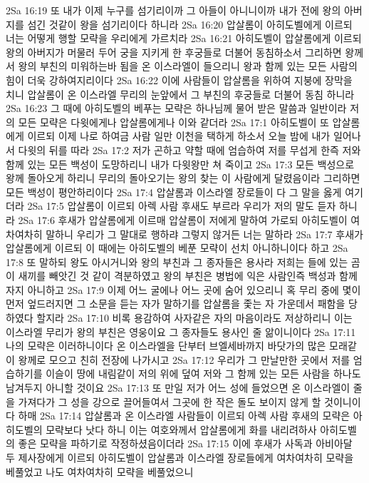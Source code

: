 2Sa 16:19  또 내가 이제 누구를 섬기리이까 그 아들이 아니니이까 내가 전에 왕의 아버지를 섬긴 것같이 왕을 섬기리이다 하니라
2Sa 16:20  압살롬이 아히도벨에게 이르되 너는 어떻게 행할 모략을 우리에게 가르치라
2Sa 16:21  아히도벨이 압살롬에게 이르되 왕의 아버지가 머물러 두어 궁을 지키게 한 후궁들로 더불어 동침하소서 그리하면 왕께서 왕의 부친의 미워하는바 됨을 온 이스라엘이 들으리니 왕과 함께 있는 모든 사람의 힘이 더욱 강하여지리이다
2Sa 16:22  이에 사람들이 압살롬을 위하여 지붕에 장막을 치니 압살롬이 온 이스라엘 무리의 눈앞에서 그 부친의 후궁들로 더불어 동침 하니라
2Sa 16:23  그 때에 아히도벨의 베푸는 모략은 하나님께 물어 받은 말씀과 일반이라 저의 모든 모략은 다윗에게나 압살롬에게나 이와 같더라
2Sa 17:1  아히도벨이 또 압살롬에게 이르되 이제 나로 하여금 사람 일만 이천을 택하게 하소서 오늘 밤에 내가 일어나서 다윗의 뒤를 따라
2Sa 17:2  저가 곤하고 약할 때에 엄습하여 저를 무섭게 한즉 저와 함께 있는 모든 백성이 도망하리니 내가 다윗왕만 쳐 죽이고
2Sa 17:3  모든 백성으로 왕께 돌아오게 하리니 무리의 돌아오기는 왕의 찾는 이 사람에게 달렸음이라 그리하면 모든 백성이 평안하리이다
2Sa 17:4  압살롬과 이스라엘 장로들이 다 그 말을 옳게 여기더라
2Sa 17:5  압살롬이 이르되 아렉 사람 후새도 부르라 우리가 저의 말도 듣자 하니라
2Sa 17:6  후새가 압살롬에게 이르매 압살롬이 저에게 말하여 가로되 아히도벨이 여차여차히 말하니 우리가 그 말대로 행하랴 그렇지 않거든 너는 말하라
2Sa 17:7  후새가 압살롬에게 이르되 이 때에는 아히도벨의 베푼 모략이 선치 아니하니이다 하고
2Sa 17:8  또 말하되 왕도 아시거니와 왕의 부친과 그 종자들은 용사라 저희는 들에 있는 곰이 새끼를 빼앗긴 것 같이 격분하였고 왕의 부친은 병법에 익은 사람인즉 백성과 함께 자지 아니하고
2Sa 17:9  이제 어느 굴에나 어느 곳에 숨어 있으리니 혹 무리 중에 몇이 먼저 엎드러지면 그 소문을 듣는 자가 말하기를 압살롬을 좇는 자 가운데서 패함을 당하였다 할지라
2Sa 17:10  비록 용감하여 사자같은 자의 마음이라도 저상하리니 이는 이스라엘 무리가 왕의 부친은 영웅이요 그 종자들도 용사인 줄 앎이니이다
2Sa 17:11  나의 모략은 이러하니이다 온 이스라엘을 단부터 브엘세바까지 바닷가의 많은 모래같이 왕께로 모으고 친히 전장에 나가시고
2Sa 17:12  우리가 그 만날만한 곳에서 저를 엄습하기를 이슬이 땅에 내림같이 저의 위에 덮여 저와 그 함께 있는 모든 사람을 하나도 남겨두지 아니할 것이요
2Sa 17:13  또 만일 저가 어느 성에 들었으면 온 이스라엘이 줄을 가져다가 그 성을 강으로 끌어들여서 그곳에 한 작은 돌도 보이지 않게 할 것이니이다 하매
2Sa 17:14  압살롬과 온 이스라엘 사람들이 이르되 아렉 사람 후새의 모략은 아히도벨의 모략보다 낫다 하니 이는 여호와께서 압살롬에게 화를 내리려하사 아히도벨의 좋은 모략을 파하기로 작정하셨음이더라
2Sa 17:15  이에 후새가 사독과 아비아달 두 제사장에게 이르되 아히도벨이 압살롬과 이스라엘 장로들에게 여차여차히 모략을 베풀었고 나도 여차여차히 모략을 베풀었으니
